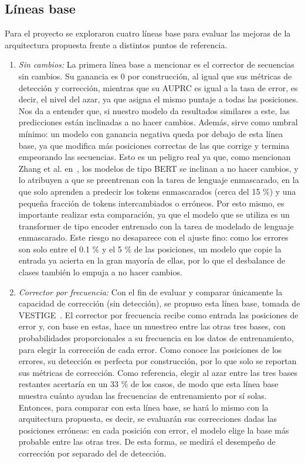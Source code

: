 \documentclass[sigconf,nonacm]{acmart}
\begin{document}
\subsection{Líneas base}\label{sec:lineas-base}

Para el proyecto se exploraron cuatro líneas base para evaluar las mejoras de la arquitectura propuesta frente a distintos puntos de referencia.

\begin{enumerate}

\item \emph{Sin cambios:} La primera línea base a mencionar es el corrector de secuencias sin cambios. Su ganancia es 0 por construcción, al igual que sus métricas de detección y corrección, mientras que su AUPRC es igual a la tasa de error, es decir, el nivel del azar, ya que asigna el mismo puntaje a todas las posiciones. Nos da a entender que, si nuestro modelo da resultados similares a este, las predicciones están inclinadas a no hacer cambios. Además, sirve como umbral mínimo: un modelo con ganancia negativa queda por debajo de esta línea base, ya que modifica más posiciones correctas de las que corrige y termina empeorando las secuencias. Esto es un peligro real ya que, como mencionan Zhang et al. en~\cite{zhang2020spelling}, los modelos de tipo BERT se inclinan a no hacer cambios, y lo atribuyen a que se preentrenan con la tarea de lenguaje enmascarado, en la que solo aprenden a predecir los tokens enmascarados (cerca del 15 \%) y una pequeña fracción de tokens intercambiados o erróneos. Por esto mismo, es importante realizar esta comparación, ya que el modelo que se utiliza es un transformer de tipo encoder entrenado con la tarea de modelado de lenguaje enmascarado. Este riesgo no desaparece con el ajuste fino: como los errores son solo entre el 0.1 \% y el 5 \% de las posiciones, un modelo que copie la entrada ya acierta en la gran mayoría de ellas, por lo que el desbalance de clases también lo empuja a no hacer cambios.

\item \emph{Corrector por frecuencia:} Con el fin de evaluar y comparar únicamente la capacidad de corrección (sin detección), se propuso esta línea base, tomada de VESTIGE~\cite{chakravertty2026vestige}. El corrector por frecuencia recibe como entrada las posiciones de error y, con base en estas, hace un muestreo entre las otras tres bases, con probabilidades proporcionales a su frecuencia en los datos de entrenamiento, para elegir la corrección de cada error. Como conoce las posiciones de los errores, su detección es perfecta por construcción, por lo que solo se reportan sus métricas de corrección. Como referencia, elegir al azar entre las tres bases restantes acertaría en un 33 \% de los casos, de modo que esta línea base muestra cuánto ayudan las frecuencias de entrenamiento por sí solas. Entonces, para comparar con esta línea base, se hará lo mismo con la arquitectura propuesta, es decir, se evaluarán sus correcciones dadas las posiciones erróneas: en cada posición con error, el modelo elige la base más probable entre las otras tres. De esta forma, se medirá el desempeño de corrección por separado del de detección.


\end{enumerate}
\end{document}
